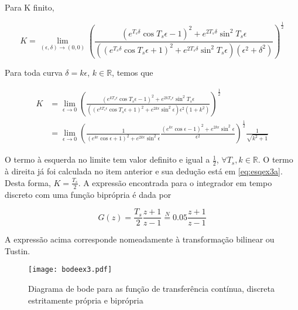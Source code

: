 \begin{enumerate}
        Para K finito, 
        
            \begin{equation}
                K = \lim\limits_{(\epsilon, \delta) \rightarrow (0, 0)} \left( \frac{(e^{T_s \delta} \cos T_s \epsilon - 1)^2 +  e^{2 T_s \delta} \sin^2 T_s \epsilon}{((e^{T_s \delta} \cos T_s \epsilon + 1)^2 +  e^{2 T_s \delta} \sin^2 T_s \epsilon) (\epsilon^2 + \delta^2)} \right)^{\frac{1}{2}}
            \end{equation}
        
        Para toda curva $\delta = k \epsilon$, $k \in \mathbb{R}$, temos que 

        \begin{equation}
            \begin{split}
                K &= \lim\limits_{\epsilon \rightarrow 0} \left( \frac{(e^{k T_s \epsilon} \cos T_s \epsilon - 1)^2 +  e^{2 k T_s \epsilon} \sin^2 T_s \epsilon}{((e^{k T_s \epsilon} \cos T_s \epsilon + 1)^2 +  e^{2 k \epsilon} \sin^2 \epsilon) \epsilon^2 (1 + k^2)} \right)^{\frac{1}{2}} \\
                & = \lim\limits_{\epsilon \rightarrow 0} \left( \frac{1}{(e^{k \epsilon} \cos \epsilon + 1)^2 +  e^{2 k \epsilon} \sin^2 \epsilon} \frac{(e^{k \epsilon} \cos \epsilon - 1)^2 +  e^{2 k \epsilon} \sin^2 \epsilon}{\epsilon^2} \right)^{\frac{1}{2}} \frac{1}{\sqrt{k^2 + 1}}
            \end{split}
        \end{equation}
        
        O termo à esquerda no limite tem valor definito e igual a $\frac{1}{2}$, $\forall T_s, k \in \mathbb{R}$. O termo à direita já foi calculada no item anterior e sua dedução está em \eqref{eq:esqex3a}. Desta forma, $K = \frac{T_s}{2}$. A expressão encontrada para o integrador em tempo discreto com uma função biprópria é dada por 
        
            \begin{equation}
                G(z) = \frac{T_s}{2} \frac{z + 1}{z - 1} \stackrel{N}{=} 0.05 \frac{z + 1}{z - 1}
            \end{equation}
        
        A expressão acima corresponde nomeadamente à transformação bilinear ou Tustin.
        
    \begin{figure}[H]
        \texttt{[image: bodeex3.pdf]}
        \caption{\label{fig:ex1ac} Diagrama de bode para as função de transferência contínua, discreta estritamente própria e biprópria} 
    \end{figure}

    \end{enumerate}